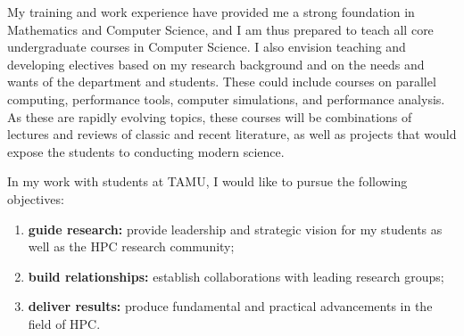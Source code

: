 \documentclass[11pt]{article}
\begin{document}
My training and work experience have provided me a strong foundation in Mathematics and Computer Science, and I am thus prepared to teach all core undergraduate
courses in Computer Science.  I also envision teaching and developing electives based on my research background and on the needs and wants of the department and students.
These could include courses on parallel computing, performance tools, computer simulations, and performance analysis.
As these are rapidly evolving topics, these courses will be combinations of lectures and reviews of classic and recent literature,
as well as projects that would expose the students to conducting modern science.


In my work with students at TAMU, I would like to pursue the following objectives:

\begin{enumerate}
\item {\bf guide research:} provide leadership and strategic vision for my students as well as the HPC research community;
\item {\bf build relationships:} establish collaborations with leading research groups;
\item {\bf deliver results:} produce fundamental and practical advancements in the field of HPC.
\end{enumerate}
\end{document}
